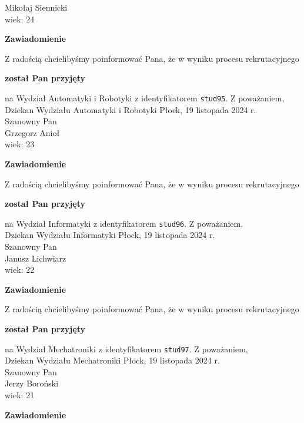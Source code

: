 \documentclass[12pt,a4paper]{article}
\begin{document}
Mikołaj Siennicki \\
wiek: 24
\bigskip
\begin{center}
    {\Large\textbf{Zawiadomienie}}
\end{center}
\bigskip 
Z radością chcielibyśmy poinformować Pana, że w wyniku procesu rekrutacyjnego
\begin{center}
\textsf{\textbf{został Pan przyjęty}}
\end{center}
na Wydział Automatyki i Robotyki z identyfikatorem \verb|stud95|. 
\vspace{2cm}
\noindent
Z poważaniem, \\
Dziekan
Wydziału Automatyki i Robotyki
\newpage
\hfill Płock, 19 listopada 2024 r. \\
\noindent
Szanowny Pan \\
Grzegorz Anioł \\
wiek: 23
\bigskip
\begin{center}
    {\Large\textbf{Zawiadomienie}}
\end{center}
\bigskip 
Z radością chcielibyśmy poinformować Pana, że w wyniku procesu rekrutacyjnego
\begin{center}
\textsf{\textbf{został Pan przyjęty}}
\end{center}
na Wydział Informatyki z identyfikatorem \verb|stud96|. 
\vspace{2cm}
\noindent
Z poważaniem, \\
Dziekan
Wydziału Informatyki
\newpage
\hfill Płock, 19 listopada 2024 r. \\
\noindent
Szanowny Pan \\
Janusz Lichwiarz \\
wiek: 22
\bigskip
\begin{center}
    {\Large\textbf{Zawiadomienie}}
\end{center}
\bigskip 
Z radością chcielibyśmy poinformować Pana, że w wyniku procesu rekrutacyjnego
\begin{center}
\textsf{\textbf{został Pan przyjęty}}
\end{center}
na Wydział Mechatroniki z identyfikatorem \verb|stud97|. 
\vspace{2cm}
\noindent
Z poważaniem, \\
Dziekan
Wydziału Mechatroniki
\newpage
\hfill Płock, 19 listopada 2024 r. \\
\noindent
Szanowny Pan \\
Jerzy Boroński \\
wiek: 21
\bigskip
\begin{center}
    {\Large\textbf{Zawiadomienie}}
\end{center}
\end{document}

